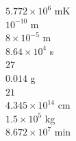 \documentclass[12pt,addpoints]{evalua}
\begin{document}
\begin{questions}
\begin{minipage}[t][][t]{.78\textwidth}
      \end{minipage}
      \begin{minipage}[t][][t]{.3\textwidth}
            \begin{choices}
                  \choice $5.772  \times 10^6$ mK   \\
                  \choice $10^{-10}$ m              \\
                  \choice $8 \times 10^{-5}$ m      \\
                  \choice $8.64 \times 10^4$ s      \\
                  \choice $27$                      \\
                  \choice $0.014$ g                 \\
                  \choice $21$                      \\
                  \choice $4.345 \times 10^{14}$ cm \\
                  \choice $1.5 \times 10^5$ kg      \\
                  \choice $8.672 \times 10^7$ min   \\
            \end{choices}
      \end{minipage}



\end{questions}
\end{document}
